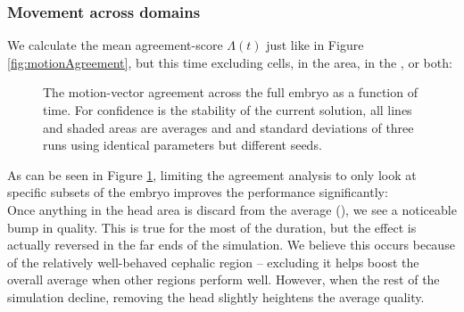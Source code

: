 \subsubsection{Movement across domains}

We calculate the mean agreement-score $\Lambda(t)$ just like in Figure \ref{fig:motionAgreement}, but this time excluding cells, in the  area, in the , or both:



\begin{figure}[H]
    \centering
    \caption{The motion-vector agreement across the full embryo as a function of time. For confidence is the stability of the current solution, all lines and shaded areas are averages and and standard deviations of three runs using identical parameters but different seeds.}
    \label{fig:vector-subsets}
\end{figure}

As can be seen in Figure \ref{fig:vector-subsets}, limiting the agreement analysis to only look at specific subsets of the embryo improves the performance significantly:\\

Once anything in the head area is discard from the average (), we see a noticeable bump in quality. This is true for the most of the duration, but the effect is actually reversed in the far ends of the simulation. We believe this occurs because of the relatively well-behaved cephalic region --  excluding it helps boost the overall average when other regions perform well. However, when the rest of the simulation decline, removing the head slightly heightens the average quality. \\

